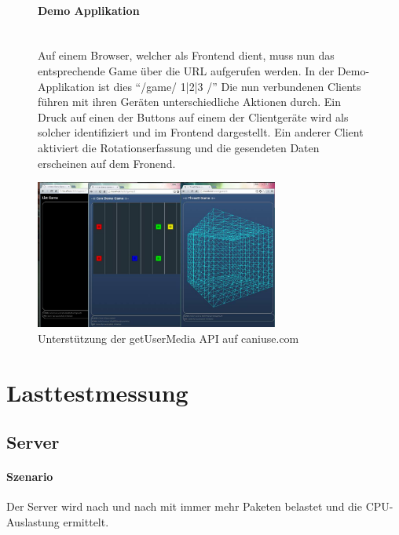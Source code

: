 \documentclass[a4paper]{spie}  %
\begin{document}
\begin{figure}[H]
\begin{minipage}[t]{0.4\textwidth}
\vspace{0pt}
\paragraph{Demo Applikation}\mbox{}\\
Auf einem Browser, welcher als Frontend dient, muss nun das entsprechende Game über die URL aufgerufen werden. In der Demo-Applikation ist dies \enquote{/game/ 1|2|3 /}
Die nun verbundenen Clients führen mit ihren Geräten unterschiedliche Aktionen durch. Ein Druck auf einen der Buttons auf einem der Clientgeräte wird als solcher identifiziert und im Frontend dargestellt. Ein anderer Client aktiviert die Rotationserfassung und die gesendeten Daten erscheinen auf dem Fronend.

\end{minipage}
\hfill
\begin{minipage}[t]{0.5\textwidth}
\vspace{0pt}
    \includegraphics[width=8cm]{images/demoGames}
     \caption{Unterstützung der getUserMedia API auf caniuse.com}
		\label{fig:test2}
\end{minipage}
\end{figure}

\section{Lasttestmessung}\label{Lasttestmessung} %

\subsection{Server}

\paragraph{Szenario} 
Der Server wird nach und nach mit immer mehr Paketen belastet und die CPU-Auslastung ermittelt.
\end{document}
